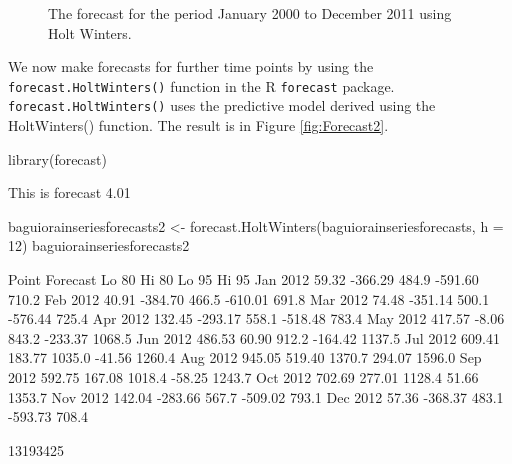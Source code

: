 \begin{figure}[!ht]

\caption{\label{fig:fitted} The forecast for the period January 2000 to December 2011 using Holt Winters.}
\end{figure}

We now make forecasts for further time points by using the
\texttt{forecast.HoltWinters()} function in the R \texttt{forecast} package. \texttt{forecast.HoltWinters()} uses the predictive model derived using the HoltWinters() function. The result is in Figure \eqref{fig:Forecast2}.

\begin{center}
\begin{Schunk}
\begin{Sinput}
library(forecast)
\end{Sinput}
\begin{Soutput}
This is forecast 4.01 
\end{Soutput}
\begin{Sinput}
baguiorainseriesforecasts2 <- forecast.HoltWinters(baguiorainseriesforecasts, 
    h = 12)
baguiorainseriesforecasts2
\end{Sinput}
\begin{Soutput}
         Point Forecast   Lo 80  Hi 80   Lo 95  Hi 95
Jan 2012          59.32 -366.29  484.9 -591.60  710.2
Feb 2012          40.91 -384.70  466.5 -610.01  691.8
Mar 2012          74.48 -351.14  500.1 -576.44  725.4
Apr 2012         132.45 -293.17  558.1 -518.48  783.4
May 2012         417.57   -8.06  843.2 -233.37 1068.5
Jun 2012         486.53   60.90  912.2 -164.42 1137.5
Jul 2012         609.41  183.77 1035.0  -41.56 1260.4
Aug 2012         945.05  519.40 1370.7  294.07 1596.0
Sep 2012         592.75  167.08 1018.4  -58.25 1243.7
Oct 2012         702.69  277.01 1128.4   51.66 1353.7
Nov 2012         142.04 -283.66  567.7 -509.02  793.1
Dec 2012          57.36 -368.37  483.1 -593.73  708.4
\end{Soutput}
\end{Schunk}
\begin{Soutput}
[1] 13193425
\end{Soutput}


\end{center}

